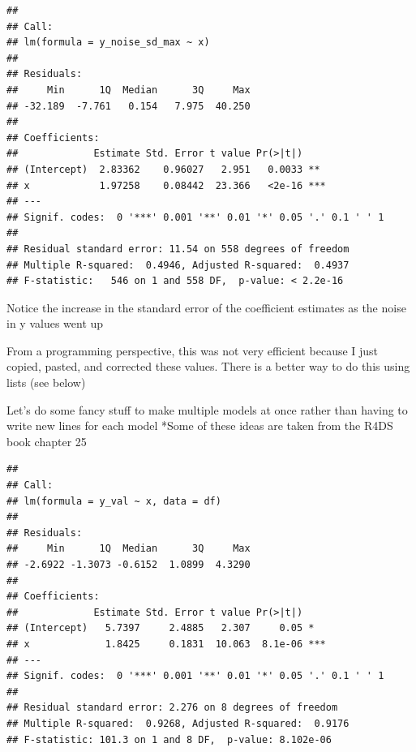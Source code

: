 \documentclass[
]{book}
\newenvironment{Shaded}{\begin{snugshade}}{\end{snugshade}}
\newcommand{\AttributeTok}[1]{\textcolor[rgb]{0.77,0.63,0.00}{#1}}
\newcommand{\ControlFlowTok}[1]{\textcolor[rgb]{0.13,0.29,0.53}{\textbf{#1}}}
\newcommand{\DecValTok}[1]{\textcolor[rgb]{0.00,0.00,0.81}{#1}}
\newcommand{\FunctionTok}[1]{\textcolor[rgb]{0.00,0.00,0.00}{#1}}
\newcommand{\NormalTok}[1]{#1}
\newcommand{\OtherTok}[1]{\textcolor[rgb]{0.56,0.35,0.01}{#1}}
\newcommand{\SpecialCharTok}[1]{\textcolor[rgb]{0.00,0.00,0.00}{#1}}
\begin{document}
\begin{verbatim}
## 
## Call:
## lm(formula = y_noise_sd_max ~ x)
## 
## Residuals:
##     Min      1Q  Median      3Q     Max 
## -32.189  -7.761   0.154   7.975  40.250 
## 
## Coefficients:
##             Estimate Std. Error t value Pr(>|t|)    
## (Intercept)  2.83362    0.96027   2.951   0.0033 ** 
## x            1.97258    0.08442  23.366   <2e-16 ***
## ---
## Signif. codes:  0 '***' 0.001 '**' 0.01 '*' 0.05 '.' 0.1 ' ' 1
## 
## Residual standard error: 11.54 on 558 degrees of freedom
## Multiple R-squared:  0.4946, Adjusted R-squared:  0.4937 
## F-statistic:   546 on 1 and 558 DF,  p-value: < 2.2e-16
\end{verbatim}

Notice the increase in the standard error of the coefficient estimates as the noise in y values went up

From a programming perspective, this was not very efficient because I just copied, pasted, and corrected these values.
There is a better way to do this using lists (see below)

Let's do some fancy stuff to make multiple models at once rather than having to write new lines for each model
*Some of these ideas are taken from the R4DS book chapter 25

\begin{Shaded}
\end{Shaded}

\begin{verbatim}
## 
## Call:
## lm(formula = y_val ~ x, data = df)
## 
## Residuals:
##     Min      1Q  Median      3Q     Max 
## -2.6922 -1.3073 -0.6152  1.0899  4.3290 
## 
## Coefficients:
##             Estimate Std. Error t value Pr(>|t|)    
## (Intercept)   5.7397     2.4885   2.307     0.05 *  
## x             1.8425     0.1831  10.063  8.1e-06 ***
## ---
## Signif. codes:  0 '***' 0.001 '**' 0.01 '*' 0.05 '.' 0.1 ' ' 1
## 
## Residual standard error: 2.276 on 8 degrees of freedom
## Multiple R-squared:  0.9268, Adjusted R-squared:  0.9176 
## F-statistic: 101.3 on 1 and 8 DF,  p-value: 8.102e-06
\end{verbatim}
\end{document}
